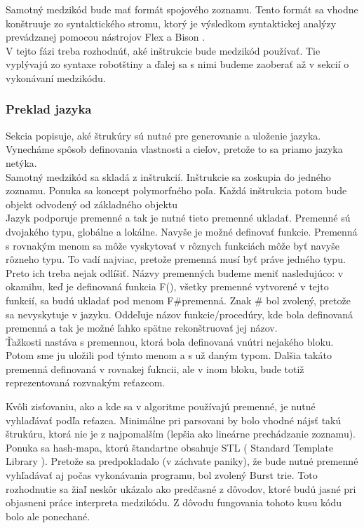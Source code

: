 
Samotný medzikód bude mať formát spojového zoznamu. Tento formát sa vhodne konštruuje zo syntaktického stromu, ktorý je výsledkom syntaktickej analýzy prevádzanej pomocou nástrojov Flex a Bison \cite{flex}.\\

V tejto fázi treba rozhodnúť, aké inštrukcie bude medzikód používať. Tie vyplývajú zo syntaxe robotštiny a ďalej sa s nimi budeme zaoberať až v sekcií o vykonávaní medzikódu.

\subsubsection{Preklad jazyka}
Sekcia popisuje, aké štrukúry sú nutné pre generovanie a uloženie jazyka. Vynecháme spôsob definovania vlastnosti a cieľov, pretože to sa priamo jazyka netýka.\\

Samotný medzikód sa skladá z inštrukcií. Inštrukcie sa zoskupia do jedného zoznamu. Ponuka sa koncept  polymorfného poľa. %
Každá inštrukcia potom bude objekt odvodený od základného objektu\\ %

Jazyk podporuje premenné a tak je nutné tieto premenné ukladať.
Premenné sú dvojakého typu, globálne a lokálne. Navyše je možné definovať funkcie. Premenná s rovnakým menom sa môže vyskytovať v rôznych funkciách  môže byť navyše rôzneho typu. To vadí najviac, pretože premenná musí byť práve jedného typu. Preto ich treba nejak odlíšiť. Názvy premenných budeme meniť nasledujúco: v okamihu, keď je definovaná funkcia F(), všetky premenné vytvorené v tejto funkcií, sa budú ukladať pod menom F\#premenná. Znak \# bol zvolený, pretože sa nevyskytuje v jazyku. Oddeľuje názov funkcie/procedúry, kde bola definovaná premenná a tak je možné ľahko spätne rekonštruovať jej názov.\\
Ťažkosti nastáva s premennou, ktorá bola definovaná vnútri nejakého bloku. Potom sme ju uložili pod týmto menom a s už daným typom. Dalšia takáto premenná definovaná v rovnakej fukncii, ale v inom bloku, bude totiž reprezentovaná rozvnakým reťazcom.

Kvôli zisťovaniu, ako a kde sa v algoritme používajú premenné, je nutné vyhlaďávať podľa reťazca. Minimálne pri parsovani by bolo vhodné nájsť takú štrukúru, ktorá nie je z najpomalším (lepšia ako lineárne prechádzanie zoznamu). Ponuka sa hash-mapa, ktorú štandartne obsahuje STL ( Standard Template Library ). Pretože sa predpokladalo (v záchvate paniky), že bude nutné premenné vyhľadávať aj počas vykonávania programu, bol zvolený Burst trie\cite{trees}. Toto rozhodnutie sa žiaľ neskôr ukázalo ako predčasné z dôvodov, ktoré budú jasné pri objasneni práce interpreta medzikódu. Z dôvodu fungovania tohoto kusu kódu bolo ale ponechané.


